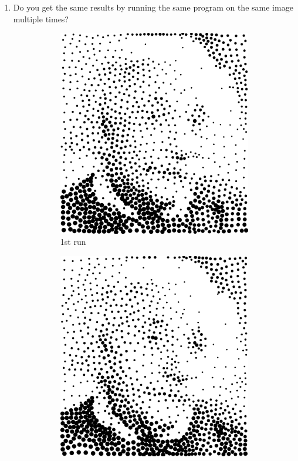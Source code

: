 \documentclass[11pt]{article}
\begin{document}
\begin{enumerate}
\item Do you get the same results by running the same program on the same image multiple times?

\begin{figure}[H]
    \centering
        \begin{subfigure}{0.4\textwidth}
        \centering
        \includegraphics[width=\textwidth]{../results/hedcuter/1-1.pdf}
        \caption{1st run}
    \end{subfigure}
    \begin{subfigure}{0.4\textwidth}
        \centering
        \includegraphics[width=\textwidth]{../results/hedcuter/1-2.pdf}

\end{subfigure}
\end{figure}
\end{enumerate}
\end{document}

